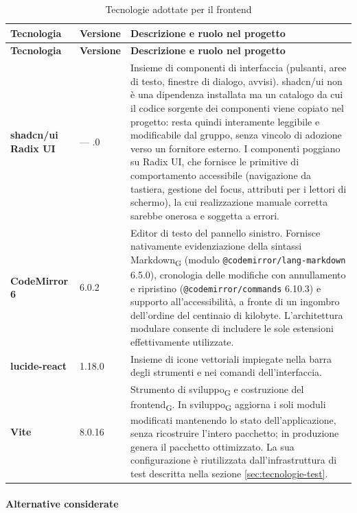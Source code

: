 \documentclass[a4paper, 10pt]{article}
\newenvironment{tabellatec}[2]{%
  \begingroup
  \small
  \setlength{\tabcolsep}{4pt}
  \begin{longtable}{|p{2.8cm}|p{1.5cm}|p{9.2cm}|}
    \caption{#1}\label{#2}\\
    \hline
    \textbf{Tecnologia} & \textbf{Versione} & \textbf{Descrizione e ruolo nel progetto} \\
    \hline
    \endfirsthead
    \hline
    \textbf{Tecnologia} & \textbf{Versione} & \textbf{Descrizione e ruolo nel progetto} \\
    \hline
    \endhead
}{%
  \end{longtable}
  \endgroup
}
\begin{document}
\begin{tabellatec}{Tecnologie adottate per il frontend}{tab:tec-frontend}
    \textbf{shadcn/ui \newline Radix UI} & --- \newline 1.5.0 & Insieme di componenti di interfaccia (pulsanti, aree di testo, finestre di dialogo, avvisi). shadcn/ui non è una dipendenza installata ma un catalogo da cui il codice sorgente dei componenti viene copiato nel progetto: resta quindi interamente leggibile e modificabile dal gruppo, senza vincolo di adozione verso un fornitore esterno. I componenti poggiano su Radix UI, che fornisce le primitive di comportamento accessibile (navigazione da tastiera, gestione del focus, attributi per i lettori di schermo), la cui realizzazione manuale corretta sarebbe onerosa e soggetta a errori. \\ \hline

    \textbf{CodeMirror 6} & 6.0.2 & Editor di testo del pannello sinistro. Fornisce nativamente evidenziazione della sintassi Markdown\textsubscript{G} (modulo \texttt{@codemirror/lang-mark\-down} 6.5.0), cronologia delle modifiche con annullamento e ripristino (\texttt{@codemirror/com\-mands} 6.10.3) e supporto all'accessibilità, a fronte di un ingombro dell'ordine del centinaio di kilobyte. L'architettura modulare consente di includere le sole estensioni effettivamente utilizzate. \\ \hline

    \textbf{lucide-react} & 1.18.0 & Insieme di icone vettoriali impiegate nella barra degli strumenti e nei comandi dell'interfaccia. \\ \hline

    \textbf{Vite} & 8.0.16 & Strumento di sviluppo\textsubscript{G} e costruzione del frontend\textsubscript{G}. In sviluppo\textsubscript{G} aggiorna i soli moduli modificati mantenendo lo stato dell'applicazione, senza ricostruire l'intero pacchetto; in produzione genera il pacchetto ottimizzato. La sua configurazione è riutilizzata dall'infrastruttura di test descritta nella sezione \ref{sec:tecnologie-test}. \\ \hline
\end{tabellatec}

\paragraph{Alternative considerate}\mbox{}
\end{document}
